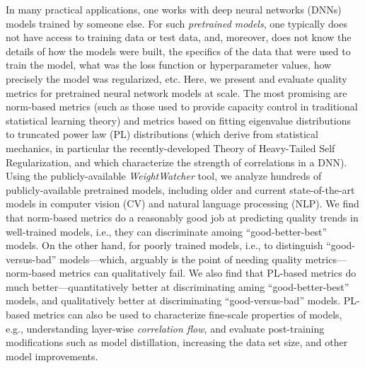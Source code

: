 In many practical applications, one works with deep neural networks (DNNs) models trained by someone else.
For such \emph{pretrained models}, one typically does not have access to training data or test data, and, moreover,  does not know the details of how the models were built, the specifics of the data that were used to train the model, what was the loss function or hyperparameter values, how precisely the model was regularized, etc.
Here, we present and evaluate quality metrics for pretrained neural network models at scale.
The most promising are norm-based metrics (such as those used to provide capacity control in traditional statistical learning theory) and metrics based on fitting eigenvalue distributions to truncated power law (PL) distributions (which derive from statistical mechanics, in particular the recently-developed Theory of Heavy-Tailed Self Regularization, and which characterize the strength of correlations in a DNN). 
%
Using the publicly-available \emph{WeightWatcher} tool, we analyze hundreds of publicly-available pretrained models, including older and current state-of-the-art models in computer vision (CV) and natural language processing (NLP).
We find that norm-based metrics do a reasonably good job at predicting quality trends in well-trained models, i.e., they can discriminate amoing ``good-better-best''  models.
On the other hand, for poorly trained models, i.e., to distinguish ``good-versus-bad'' models---which, arguably is the point of needing quality metrics---norm-based metrics can qualitatively fail.  
We also find that PL-based metrics do much better---quantitatively better at discriminating aming ``good-better-best'' models, and qualitatively better at discriminating ``good-versus-bad'' models.
PL-based metrics can also be used to characterize fine-scale properties of models, e.g., understanding layer-wise \emph{correlation flow}, and evaluate post-training modifications such as model distillation, increasing the data set size, and other model improvements.

